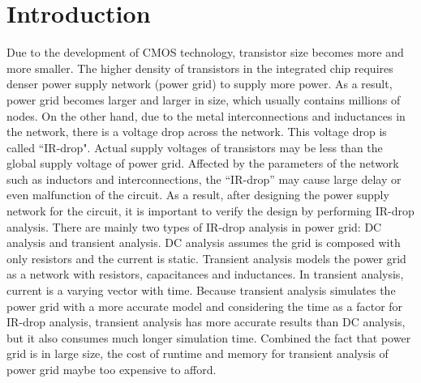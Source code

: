 \section{Introduction}
Due to the development of CMOS technology, transistor size becomes more and more smaller. The higher density of transistors in the integrated chip requires denser power supply network (power grid) to supply more power. As a result, power grid becomes larger and larger in size, which usually contains millions of nodes. On the other hand, due to the metal interconnections and inductances in the network, there is a voltage drop across the network. This voltage drop is called ``IR-drop". Actual supply voltages of transistors may be less than the global supply voltage of power grid. Affected by the parameters of the network such as inductors and interconnections, the ``IR-drop'' may cause large delay or even malfunction of the circuit. As a result, after designing the power supply network for the circuit, it is important to verify the design by performing IR-drop analysis. There are mainly two types of
IR-drop analysis in power grid: DC analysis and transient analysis. DC analysis assumes the grid is composed with only resistors and the current is static. Transient analysis models the power grid as a network with resistors, capacitances and inductances. In transient analysis, current is a varying vector with time. Because transient analysis simulates the power grid with a more accurate model and considering the time as a factor for IR-drop analysis, transient analysis has more accurate results than DC analysis, but it also consumes much longer simulation time. Combined the fact that power grid is in large size, the cost of runtime and memory for transient analysis of power grid maybe too expensive to afford. 


